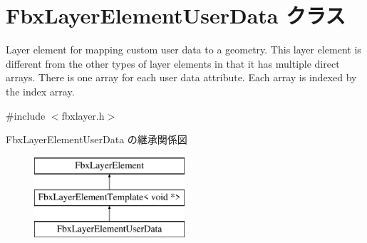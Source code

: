 \hypertarget{class_fbx_layer_element_user_data}{}\section{Fbx\+Layer\+Element\+User\+Data クラス}
\label{class_fbx_layer_element_user_data}


Layer element for mapping custom user data to a geometry. This layer element is different from the other types of layer elements in that it has multiple direct arrays. There is one array for each user data attribute. Each array is indexed by the index array.  




{\ttfamily \#include $<$fbxlayer.\+h$>$}

Fbx\+Layer\+Element\+User\+Data の継承関係図\begin{figure}[H]
\begin{center}
\leavevmode
\includegraphics[height=3.000000cm]{class_fbx_layer_element_user_data}
\end{center}
\end{figure}
